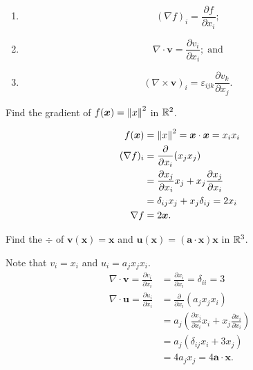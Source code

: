 
\begin{definition}
    \begin{enumerate}
        \item \[ \left(\nabla f\right)_i = \frac{\partial f}{\partial x_i}; \]
        \item \[ \nabla \cdot \bm v = \frac{\partial v_i}{\partial x_i}; \;\text{and}  \]
        \item \[ (\nabla \times \bm v)_i = \varepsilon_{ijk} \frac{\partial v_k}{\partial x_j}. \]
    \end{enumerate}
\end{definition}

\begin{example}
    Find the gradient of $f(\bm x) = \left\lVert x\right\rVert^2$ in $\mathbb{R}^2$.
\end{example}

\begin{solution}
    \begin{align*}
        f(\bm x)     &= \left\lVert x\right\rVert^2 = \bm x \cdot \bm x = x_ix_i \\
        (\nabla f)_i &= \frac{\partial}{\partial x_i}(x_jx_j) \\
                     &= \frac{\partial x_j}{\partial x_i} x_j + x_j \frac{\partial x_j}{\partial x_i} \\
                     &= \delta_{ij}x_j + x_j\delta_{ij} = 2x_i \\
        \nabla f     &= 2\bm x.
    \end{align*}
\end{solution}

\begin{example}
    Find the $\div$ of $\bm v(\bm x) = \bm x$ and $\bm u(\bm x) = (\bm a \cdot \bm x) \bm x$ in $\mathbb{R}^3$.
\end{example}

\begin{solution}
    Note that $v_i = x_i$ and $u_i = a_jx_jx_i$.
    \begin{align*}
        \nabla \cdot \bm v = \frac{\partial v_i}{\partial x_i} &= \frac{\partial x_i}{\partial x_i} = \delta_{ii} = 3 \\
        \nabla \cdot \bm u = \frac{\partial u_i}{\partial x_i} &= \frac{\partial}{\partial x_i} (a_jx_jx_i) \\
                                                               &= a_j \left( \frac{\partial x_j}{\partial x_i} x_i + x_j \frac{\partial x_i}{\partial x_i} \right) \\
                                                               &= a_j (\delta_{ij} x_i + 3x_j) \\
                                                               &= 4a_jx_j = 4\bm a \cdot \bm x.
    \end{align*}
\end{solution}

